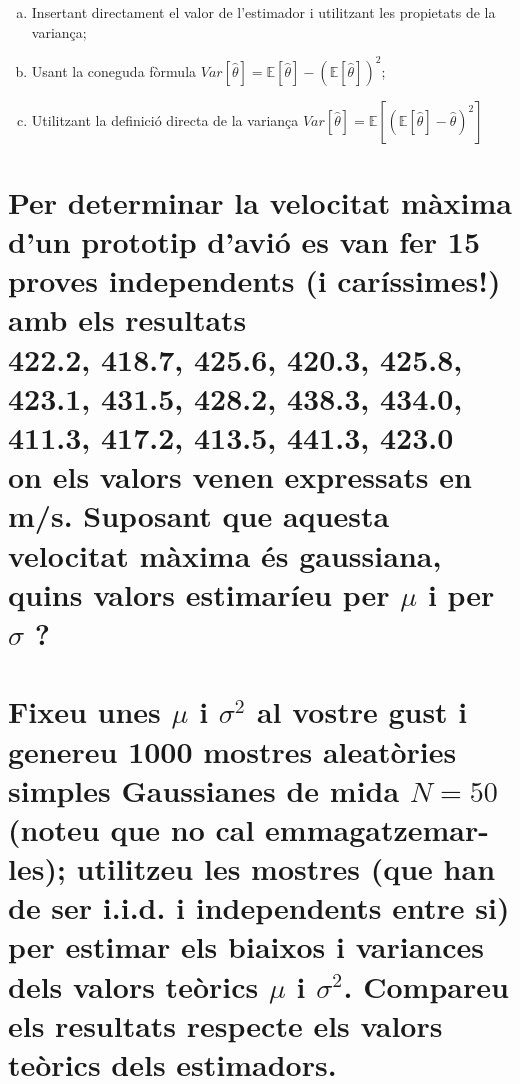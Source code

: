 \documentclass[a4paper,10pt]{article}
\begin{document}
\begin{enumerate}[(a)]
\item Insertant directament el valor de l'estimador i utilitzant les propietats de la variança;
\item Usant la coneguda fòrmula $Var[\hat{\theta}] = \mathbb{E}[\hat{\theta}] - (\mathbb{E}[\hat{\theta}])^2$;
\item Utilitzant la definició directa de la variança $Var[\hat{\theta}] = \mathbb{E}[(\mathbb{E}[\hat{\theta}] - \hat{\theta})^2]$
\end{enumerate}

\section{Per determinar la velocitat màxima d'un prototip d'avió es van fer 15 proves independents (i
caríssimes!) amb els resultats
\\
422.2, 418.7, 425.6, 420.3, 425.8, 423.1, 431.5, 428.2, 438.3, 434.0, 411.3, 417.2, 413.5, 441.3, 423.0
\\
on els valors venen expressats en m/s. Suposant que aquesta velocitat màxima és gaussiana, quins
valors estimaríeu per $\mu$ i per $\sigma$ ?}

\section{Fixeu unes $\mu$ i $\sigma^2$ al vostre gust i genereu 1000 mostres aleatòries simples Gaussianes de mida $N = 50$ (noteu que no cal emmagatzemar-les); utilitzeu les mostres (que han de ser i.i.d. i
independents entre si) per estimar els biaixos i variances dels valors teòrics
$\mu$ i $\sigma^2$. Compareu els
resultats respecte els valors teòrics dels estimadors.
}
\end{document}
